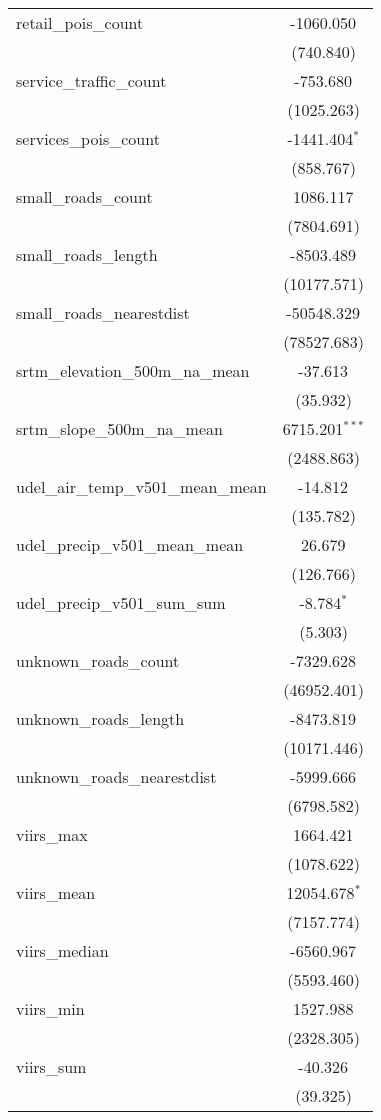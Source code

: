 \begin{table}[!htbp]
\begin{tabular}{@{\extracolsep{5pt}}lc}
 retail_pois_count & -1060.050$^{}$ \\
  & (740.840) \\
 service_traffic_count & -753.680$^{}$ \\
  & (1025.263) \\
 services_pois_count & -1441.404$^{*}$ \\
  & (858.767) \\
 small_roads_count & 1086.117$^{}$ \\
  & (7804.691) \\
 small_roads_length & -8503.489$^{}$ \\
  & (10177.571) \\
 small_roads_nearestdist & -50548.329$^{}$ \\
  & (78527.683) \\
 srtm_elevation_500m_na_mean & -37.613$^{}$ \\
  & (35.932) \\
 srtm_slope_500m_na_mean & 6715.201$^{***}$ \\
  & (2488.863) \\
 udel_air_temp_v501_mean_mean & -14.812$^{}$ \\
  & (135.782) \\
 udel_precip_v501_mean_mean & 26.679$^{}$ \\
  & (126.766) \\
 udel_precip_v501_sum_sum & -8.784$^{*}$ \\
  & (5.303) \\
 unknown_roads_count & -7329.628$^{}$ \\
  & (46952.401) \\
 unknown_roads_length & -8473.819$^{}$ \\
  & (10171.446) \\
 unknown_roads_nearestdist & -5999.666$^{}$ \\
  & (6798.582) \\
 viirs_max & 1664.421$^{}$ \\
  & (1078.622) \\
 viirs_mean & 12054.678$^{*}$ \\
  & (7157.774) \\
 viirs_median & -6560.967$^{}$ \\
  & (5593.460) \\
 viirs_min & 1527.988$^{}$ \\
  & (2328.305) \\
 viirs_sum & -40.326$^{}$ \\
  & (39.325) \\

\end{tabular}
\end{table}
